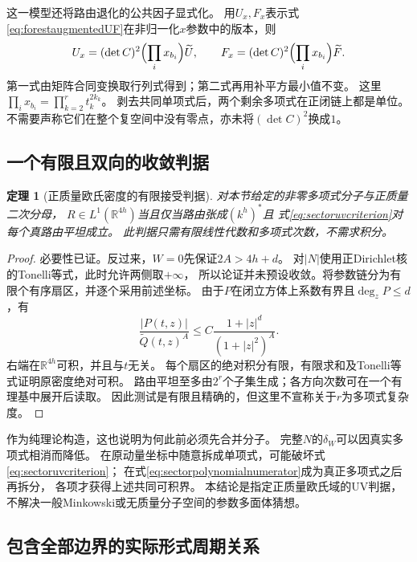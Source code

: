 \documentclass[11pt,a4paper]{ctexart}
\theoremstyle{cnplain}\newtheorem{theorem}{定理}[section]
\theoremstyle{definition}\newtheorem{definition}[theorem]{定义}
\theoremstyle{remark}\newtheorem{remark}[theorem]{注}
\begin{document}
这一模型还将路由退化的公共因子显式化。
用$U_x,F_x$表示式\eqref{eq:forestaugmentedUF}在非归一化$x$参数中的版本，则
\begin{equation}
 U_x=(\det C)^2\Bigl(\prod_i x_{b_i}\Bigr)\widetilde U,
 \qquad
 F_x=(\det C)^2\Bigl(\prod_i x_{b_i}\Bigr)\widetilde F.
 \label{eq:sectorUFfactor}
\end{equation}
第一式由矩阵合同变换取行列式得到；第二式再用补平方最小值不变。
这里$\prod_i x_{b_i}=\prod_{k=2}^r t_k^{2k_k}$。
剥去共同单项式后，两个剩余多项式在正闭链上都是单位。
不需要声称它们在整个复空间中没有零点，亦未将$(\det C)^2$换成$1$。

\subsection{一个有限且双向的收敛判据}

\begin{theorem}[正质量欧氏密度的有限接受判据]
\label{thm:sectorconvergence}
对本节给定的非零多项式分子与正质量二次分母，
$R\in L^1(\mathbb R^{4h})$当且仅当路由张成$(k^h)^*$且
式\eqref{eq:sectoruvcriterion}对每个真路由平坦成立。
此判据只需有限线性代数和多项式次数，不需求积分。
\end{theorem}

\begin{proof}
必要性已证。反过来，$W=0$先保证$2A>4h+d$。
对$|N|$使用正Dirichlet核的Tonelli等式，此时允许两侧取$+\infty$，
所以论证并未预设收敛。将参数链分为有限个有序扇区，并逐个采用前述坐标。
由于$P$在闭立方体上系数有界且$\deg_zP\leq d$，有
\[
 \frac{|P(t,z)|}{\widetilde Q(t,z)^A}
 \leq C\frac{1+|z|^d}{(1+|z|^2)^A}.
\]
右端在$\mathbb R^{4h}$可积，并且与$t$无关。
每个扇区的绝对积分有限，有限求和及Tonelli等式证明原密度绝对可积。
路由平坦至多由$2^r$个子集生成；各方向次数可在一个有理基中展开后读取。
因此测试是有限且精确的，但这里不宣称关于$r$为多项式复杂度。
\end{proof}

作为纯理论构造，这也说明为何此前必须先合并分子。
完整$N$的$\delta_W$可以因真实多项式相消而降低。
在原动量坐标中随意拆成单项式，可能破坏式\eqref{eq:sectoruvcriterion}；
在式\eqref{eq:sectorpolynomialnumerator}成为真正多项式之后再拆分，
各项才获得上述共同可积界。
本结论是指定正质量欧氏域的UV判据，
不解决一般Minkowski或无质量分子空间的参数多面体猜想\cite{CKNSector}。

\subsection{包含全部边界的实际形式周期关系}
\end{document}
